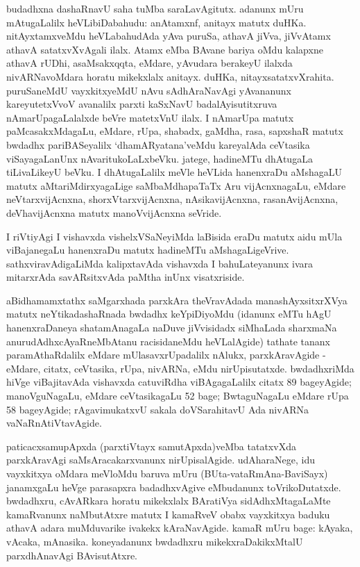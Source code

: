 budadhxna dashaRnavU saha tuMba saraLavAgitutx. adanunx mUru mAtugaLalilx heVLibiDabahudu: anAtamxnf, anitayx matutx duHKa. nitAyxtamxveMdu heVLabahudAda yAva puruSa, athavA jiVva, jiVvAtamx athavA satatxvXvAgali ilalx. Atamx eMba BAvane bariya oMdu kalapxne athavA rUDhi, asaMsakxqqta, eMdare, yAvudara berakeyU ilalxda nivARNavoMdara horatu mikekxlalx anitayx. duHKa, nitayxsatatxvXrahita. puruSaneMdU vayxkitxyeMdU nAvu sAdhAraNavAgi yAvananunx kareyutetxVvoV avanalilx parxti kaSxNavU badalAyisutitxruva nAmarUpagaLalalxde beVre matetxVnU ilalx. I nAmarUpa matutx paMcasakxMdagaLu, eMdare, rUpa, shabadx, gaMdha, rasa, sapxshaR matutx bwdadhx pariBASeyalilx `dhamARyatana'veMdu kareyalAda ceVtasika viSayagaLanUnx nAvaritukoLaLxbeVku. jatege, hadineMTu dhAtugaLa tiLivaLikeyU beVku. I dhAtugaLalilx meVle heVLida hanenxraDu aMshagaLU matutx aMtariMdirxyagaLige saMbaMdhapaTaTx Aru vijAcnxnagaLu, eMdare neVtarxvijAcnxna, shorxVtarxvijAcnxna, nAsikavijAcnxna, rasanAvijAcnxna, deVhavijAcnxna matutx manoVvijAcnxna seVride.

I riVtiyAgi I vishavxda vishelxVSaNeyiMda laBisida eraDu matutx aidu mUla viBajanegaLu hanenxraDu matutx hadineMTu aMshagaLigeVrive. sathxviravAdigaLiMda kalipxtavAda vishavxda I bahuLateyanunx ivara mitarxrAda savARsitxvAda paMtha inUnx visatxriside.

aBidhamamxtathx saMgarxhada parxkAra theVravAdada manashAyxsitxrXVya matutx neYtikadashaRnada bwdadhx keYpiDiyoMdu (idanunx eMTu hAgU hanenxraDaneya shatamAnagaLa naDuve jiVvisidadx siMhaLada sharxmaNa anurudAdhxcAyaRneMbAtanu racisidaneMdu heVLalAgide) tathate tananx paramAthaRdalilx eMdare mUlasavxrUpadalilx nAlukx, parxkAravAgide - eMdare, citatx, ceVtasika, rUpa, nivARNa, eMdu nirUpisutatxde. bwdadhxriMda hiVge viBajitavAda vishavxda catuviRdha viBAgagaLalilx citatx 89 bageyAgide; manoVguNagaLu, eMdare ceVtasikagaLu 52 bage; BwtaguNagaLu eMdare rUpa 58 bageyAgide; rAgavimukatxvU sakala doVSarahitavU Ada nivARNa vaNaRnAtiVtavAgide.

paticacxsamupApxda (parxtiVtayx samutApxda)veMba tatatxvXda parxkAravAgi saMsAracakarxvanunx nirUpisalAgide. udAharaNege, idu vayxkitxya oMdara meVloMdu baruva mUru (BUta-vataRmAna-BaviSayx) janamxgaLu heVge parasapxra badadhxvAgive eMbudanunx toVrikoDutatxde. bwdadhxru, cAvARkara horatu mikekxlalx BAratiVya sidAdhxMtagaLaMte kamaRvanunx naMbutAtxre matutx I kamaRveV obabx vayxkitxya baduku athavA adara muMduvarike ivakekx kAraNavAgide. kamaR mUru bage: kAyaka, vAcaka, mAnasika. koneyadanunx bwdadhxru mikekxraDakikxMtalU parxdhAnavAgi BAvisutAtxre.

